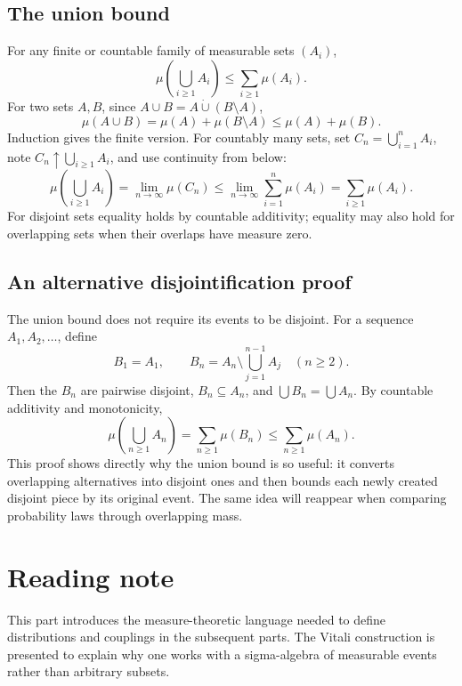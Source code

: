 \documentclass[10pt,a4paper]{article}
\begin{document}
\subsection*{The union bound}
For any finite or countable family of measurable sets $(A_i)$,
\[
\mu\left(\bigcup_{i\ge1} A_i\right)\le\sum_{i\ge1}\mu(A_i).
\]
For two sets $A,B$, since $A\cup B=A\mathbin{\dot\cup}(B\setminus A)$,
\[
\mu(A\cup B)=\mu(A)+\mu(B\setminus A)\le\mu(A)+\mu(B).
\]
Induction gives the finite version. For countably many sets, set $C_n=\bigcup_{i=1}^n A_i$, note $C_n\uparrow\bigcup_{i\ge1}A_i$, and use continuity from below:
\[
\mu\left(\bigcup_{i\ge1}A_i\right)
=\lim_{n\to\infty}\mu(C_n)
\le\lim_{n\to\infty}\sum_{i=1}^n\mu(A_i)
=\sum_{i\ge1}\mu(A_i).
\]
For disjoint sets equality holds by countable additivity; equality may also hold for overlapping sets when their overlaps have measure zero.


\subsection*{An alternative disjointification proof}
The union bound does not require its events to be disjoint. For a sequence $A_1,A_2,\ldots$, define
\[
B_1=A_1,\qquad
B_n=A_n\setminus\bigcup_{j=1}^{n-1}A_j\quad(n\ge2).
\]
Then the $B_n$ are pairwise disjoint, $B_n\subseteq A_n$, and $\bigcup B_n=\bigcup A_n$. By countable additivity and monotonicity,
\[
\mu\left(\bigcup_{n\ge1}A_n\right)
=\sum_{n\ge1}\mu(B_n)
\le\sum_{n\ge1}\mu(A_n).
\]
This proof shows directly why the union bound is so useful: it converts overlapping alternatives into disjoint ones and then bounds each newly created disjoint piece by its original event. The same idea will reappear when comparing probability laws through overlapping mass.

\section*{Reading note}
This part introduces the measure-theoretic language needed to define distributions and couplings in the subsequent parts. The Vitali construction is presented to explain why one works with a sigma-algebra of measurable events rather than arbitrary subsets.
\end{document}
